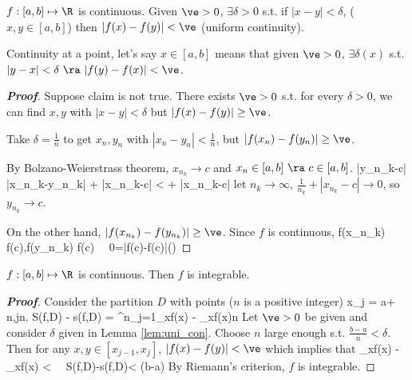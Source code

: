 \begin{lemma}\label{lem:uni_con}
$f:[a,b]\mapsto \R$ is continuous. Given $\ve>0$, $\exists \delta>0$ s.t. if $|x-y|<\delta$, ($x,y\in [a,b]$) then $|f(x)-f(y)|<\ve$ (uniform continuity).
\end{lemma}

\begin{remark}
Continuity at a point, let's say $x\in [a,b]$ means that given $\ve>0$, $\exists \delta(x)$ s.t. $|y-x|<\delta \ \ra \ |f(y)-f(x)|<\ve$.
\end{remark}

\begin{proof}[{\bf Proof}]
Suppose claim is not true. There exists $\ve>0$ s.t. for every $\delta>0$, we can find $x,y$ with $|x-y|<\delta$ but $|f(x)-f(y)|\geq \ve$.

Take $\delta = \frac 1n$ to get $x_n,y_n$ with $|x_n-y_n|<\frac 1n$, but $|f(x_n)-f(y_n)|\geq \ve$.

By Bolzano-Weierstrass theorem, $x_{n_k}\to c$ and $x_n \in [a,b]\ \ra \ c\in [a,b]$.
\be
|y_{n_k}-c| \leq |x_{n_k}-y_{n_k}| + |x_{n_k}-c| <  + |x_{n_k}-c|
\ee
let $n_k\to \infty$, $\frac 1{n_k} + |x_{n_k}-c|\to 0$, so $y_{n_k}\to c$.

On the other hand, $|f(x_{n_k})-f(y_{n_k})| \geq \ve$. Since $f$ is continuous,
\be
f(x_{n_k}) \to f(c),\quad f(y_{n_k}) \to f(c) \ \ra \ 0=|f(c)-f(c)|\geq \ve \quad ()
\ee
\end{proof}

\begin{theorem}
$f:[a,b]\mapsto \R$ is continuous. Then $f$ is integrable.
\end{theorem}

\begin{proof}[{\bf Proof}]
Consider the partition $D$ with points ($n$ is a positive integer)
\be
x_j = a+ n,\leq j\leq n.
\ee
\be
S(f,D) - s(f,D) = \sum^n_{j=1}\lob \sup_{x\in[x_{j-1},x_j]}f(x) - \inf_{x\in[x_{j-1},x_j]}f(x)\rob {}n
\ee
Let $\ve>0$ be given and consider $\delta$ given in Lemma \ref{lem:uni_con}. Choose $n$ large enough s.t. $\frac{b-a}n<\delta$. Then for any $x,y\in [x_{j-1},x_j]$, $|f(x)-f(y)|<\ve$ which implies that
\be
\sup_{x\in[x_{j-1},x_j]}f(x) - \inf_{x\in[x_{j-1},x_j]}f(x) < \ve \ \ra \ S(f,D)-s(f,D)< \ve (b-a)
\ee
By Riemann's criterion, $f$ is integrable.
\end{proof}

